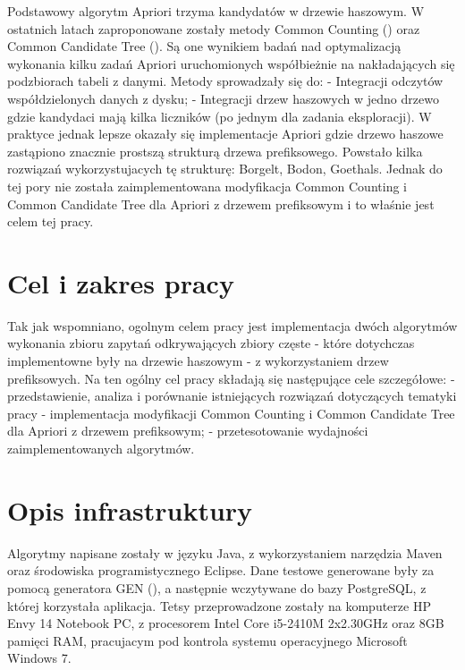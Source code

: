Podstawowy algorytm Apriori trzyma kandydatów w drzewie haszowym. W ostatnich latach zaproponowane zostały metody Common Counting (\cite{WojciechowskiCC}) oraz Common Candidate Tree (\cite{WojciechowskiCCT}). Są one wynikiem badań nad optymalizacją wykonania kilku zadań Apriori uruchomionych współbieżnie na nakładających się podzbiorach tabeli z danymi. Metody sprowadzały się do:\newline
- Integracji odczytów współdzielonych danych z dysku;\newline
- Integracji drzew haszowych w jedno drzewo gdzie kandydaci mają kilka liczników (po jednym dla zadania eksploracji).\newline
W praktyce jednak lepsze okazały się implementacje Apriori gdzie drzewo haszowe zastąpiono znacznie prostszą strukturą drzewa prefiksowego. Powstało kilka rozwiązań wykorzystujacych tę strukturę: Borgelt, Bodon, Goethals. Jednak do tej pory nie została zaimplementowana modyfikacja Common Counting i Common Candidate Tree dla Apriori z drzewem prefiksowym i to właśnie jest celem tej pracy. 

\section{Cel i zakres pracy}
\label{c12}

Tak jak wspomniano, ogolnym celem pracy jest implementacja dwóch algorytmów wykonania zbioru zapytań odkrywających zbiory częste - które dotychczas implementowne były na drzewie haszowym - z wykorzystaniem drzew prefiksowych. \newline
Na ten ogólny cel pracy składają się następujące cele szczegółowe:
- przedstawienie, analiza i porównanie istniejących rozwiązań dotyczących tematyki pracy
- implementacja modyfikacji Common Counting i Common Candidate Tree dla Apriori z drzewem prefiksowym;\newline
- przetesotowanie wydajności zaimplementowanych algorytmów.\newline

\section{Opis infrastruktury}
\label{c13}
Algorytmy napisane zostały w języku Java, z wykorzystaniem narzędzia Maven oraz środowiska programistycznego Eclipse. Dane testowe generowane były za pomocą generatora GEN (\cite{AgrawalGEN}), a następnie wczytywane do bazy PostgreSQL, z której korzystała aplikacja. Tetsy przeprowadzone zostały na komputerze HP Envy 14 Notebook PC, z procesorem Intel Core i5-2410M 2x2.30GHz oraz 8GB pamięci RAM, pracujacym pod kontrola systemu operacyjnego Microsoft Windows 7. 
	

